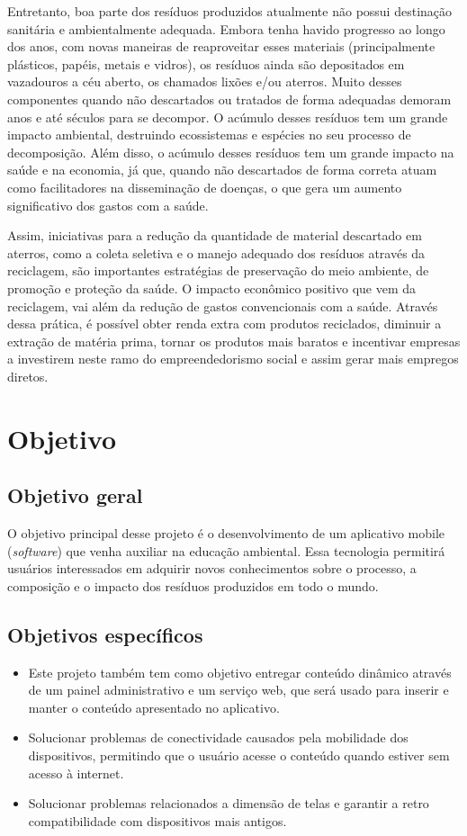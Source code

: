 \documentclass[
	12pt,				%
	openany,			%
	twoside,			%
	a4paper,			%
	english,			%
	french,				%
	spanish,			%
	brazil				%
	]{abntex2}
\begin{document}
Entretanto, boa parte dos resíduos produzidos atualmente não possui destinação sanitária e ambientalmente adequada. Embora tenha havido progresso ao longo dos anos, com novas  maneiras de reaproveitar esses materiais (principalmente plásticos, papéis, metais e vidros),  os resíduos ainda são depositados em vazadouros a céu aberto, os chamados lixões e/ou aterros. Muito desses componentes quando não descartados ou tratados de forma adequadas demoram anos e até séculos para se decompor. O acúmulo desses resíduos tem um grande impacto ambiental, destruindo ecossistemas e espécies no seu processo de decomposição. Além disso, o acúmulo desses resíduos tem um grande impacto na saúde e na economia, já que, quando não descartados de forma correta atuam como facilitadores na disseminação de doenças, o que gera um aumento significativo dos gastos com a saúde.

Assim, iniciativas para a redução da quantidade de material descartado em aterros, como a coleta seletiva e o manejo adequado dos resíduos através da reciclagem,  são importantes estratégias de preservação do meio ambiente, de promoção e proteção da saúde.
 O impacto econômico positivo que vem da reciclagem, vai além da redução de gastos convencionais com a saúde. Através dessa prática, é possível obter renda extra com produtos reciclados, diminuir a extração de matéria prima, tornar os produtos mais baratos  e incentivar empresas a investirem neste ramo do empreendedorismo social e assim gerar mais empregos diretos.
\section{Objetivo}
\subsection{Objetivo geral}
O objetivo principal desse projeto é o desenvolvimento de um aplicativo mobile (\textit{software}) que venha auxiliar na educação ambiental. Essa tecnologia permitirá usuários interessados em adquirir novos conhecimentos sobre o processo, a composição e o impacto dos resíduos produzidos em todo o mundo.

\subsection{Objetivos específicos}
\begin{itemize}
	\item Este projeto também tem como objetivo entregar conteúdo dinâmico através de um painel administrativo e um serviço web, que será usado para inserir e manter o conteúdo apresentado no aplicativo.
    \item Solucionar problemas de conectividade causados pela mobilidade dos dispositivos, permitindo que o usuário acesse o conteúdo quando estiver sem acesso à internet.
        \item Solucionar problemas relacionados a dimensão de telas e garantir a retro compatibilidade com dispositivos mais antigos.
\end{itemize}
\end{document}
